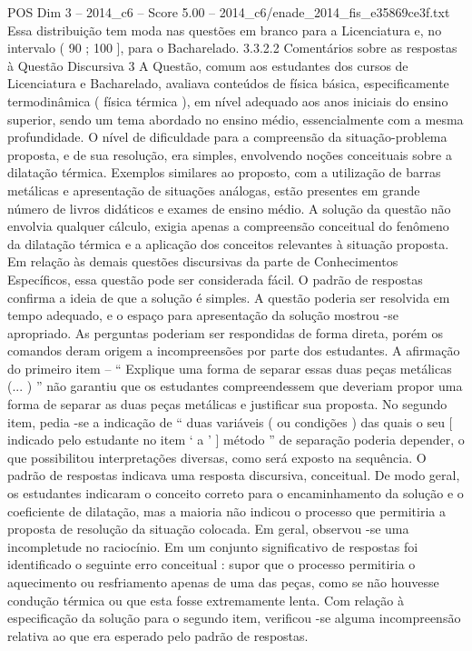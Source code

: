 \begin{textsample}{POS Dim 3 – 2014\_c6 – Score 5.00 – 2014\_c6/enade\_2014\_fis\_e35869ce3f.txt}
Essa distribuição tem moda nas questões em branco para a Licenciatura e, no intervalo ( 90 ; 100 ], para o Bacharelado. 3.3.2.2 Comentários sobre as respostas à Questão Discursiva 3 A Questão, comum aos estudantes dos cursos de Licenciatura e Bacharelado, avaliava conteúdos de física básica, especificamente termodinâmica ( física térmica ), em nível adequado aos anos iniciais do ensino superior, sendo um tema abordado no ensino médio, essencialmente com a mesma profundidade.
O nível de dificuldade para a compreensão da situação-problema proposta, e de sua resolução, era simples, envolvendo noções conceituais sobre a dilatação térmica.
Exemplos similares ao proposto, com a utilização de barras metálicas e apresentação de situações análogas, estão presentes em grande número de livros didáticos e exames de ensino médio.
A solução da questão não envolvia qualquer cálculo, exigia apenas a compreensão conceitual do fenômeno da dilatação térmica e a aplicação dos conceitos relevantes à situação proposta.
Em relação às demais questões discursivas da parte de Conhecimentos Específicos, essa questão pode ser considerada fácil.
O padrão de respostas confirma a ideia de que a solução é simples.
A questão poderia ser resolvida em tempo adequado, e o espaço para apresentação da solução mostrou -se apropriado.
As perguntas poderiam ser respondidas de forma direta, porém os comandos deram origem a incompreensões por parte dos estudantes.
A afirmação do primeiro item – “ Explique uma forma de separar essas duas peças metálicas (... ) ” não garantiu que os estudantes compreendessem que deveriam propor uma forma de separar as duas peças metálicas e justificar sua proposta.
No segundo item, pedia -se a indicação de “ duas variáveis ( ou condições ) das quais o seu [ indicado pelo estudante no item ‘ a ’ ] método ” de separação poderia depender, o que possibilitou interpretações diversas, como será exposto na sequência.
O padrão de respostas indicava uma resposta discursiva, conceitual.
De modo geral, os estudantes indicaram o conceito correto para o encaminhamento da solução e o coeficiente de dilatação, mas a maioria não indicou o processo que permitiria a proposta de resolução da situação colocada.
Em geral, observou -se uma incompletude no raciocínio.
Em um conjunto significativo de respostas foi identificado o seguinte erro conceitual : supor que o processo permitiria o aquecimento ou resfriamento apenas de uma das peças, como se não houvesse condução térmica ou que esta fosse extremamente lenta.
Com relação à especificação da solução para o segundo item, verificou -se alguma incompreensão relativa ao que era esperado pelo padrão de respostas.

\end{textsample}

